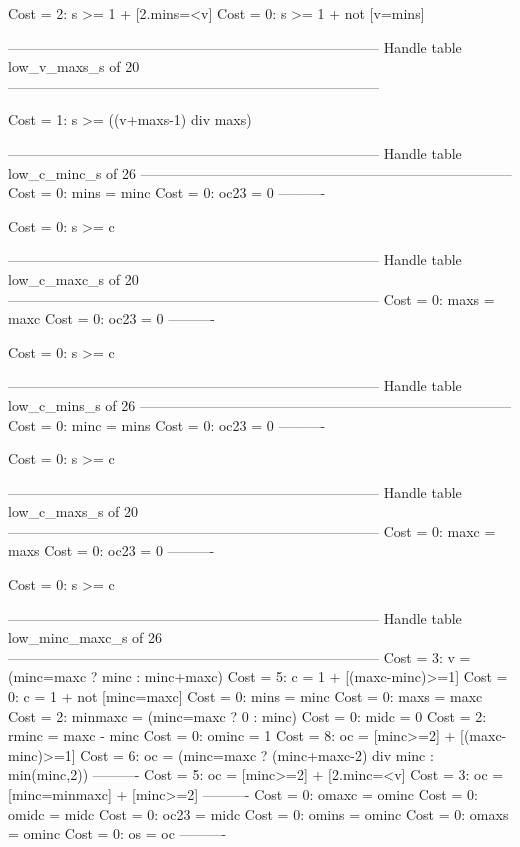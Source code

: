 Cost =  2:  s >= 1 + [2.mins=<v]
Cost =  0:  s >= 1 + not [v=mins]

--------------------------------------------------------------------------------
Handle table low_v_maxs_s of 20
--------------------------------------------------------------------------------

Cost =  1:  s >= ((v+maxs-1) div maxs)

--------------------------------------------------------------------------------
Handle table low_c_minc_s of 26
--------------------------------------------------------------------------------
Cost =  0:  mins = minc
Cost =  0:  oc23 = 0
----------

Cost =  0:  s >= c

--------------------------------------------------------------------------------
Handle table low_c_maxc_s of 20
--------------------------------------------------------------------------------
Cost =  0:  maxs = maxc
Cost =  0:  oc23 = 0
----------

Cost =  0:  s >= c

--------------------------------------------------------------------------------
Handle table low_c_mins_s of 26
--------------------------------------------------------------------------------
Cost =  0:  minc = mins
Cost =  0:  oc23 = 0
----------

Cost =  0:  s >= c

--------------------------------------------------------------------------------
Handle table low_c_maxs_s of 20
--------------------------------------------------------------------------------
Cost =  0:  maxc = maxs
Cost =  0:  oc23 = 0
----------

Cost =  0:  s >= c

--------------------------------------------------------------------------------
Handle table low_minc_maxc_s of 26
--------------------------------------------------------------------------------
Cost =  3:  v       = (minc=maxc ? minc : minc+maxc)
Cost =  5:  c       = 1 + [(maxc-minc)>=1]
Cost =  0:  c       = 1 + not [minc=maxc]
Cost =  0:  mins    = minc
Cost =  0:  maxs    = maxc
Cost =  2:  minmaxc = (minc=maxc ? 0 : minc)
Cost =  0:  midc    = 0
Cost =  2:  rminc   = maxc - minc
Cost =  0:  ominc   = 1
Cost =  8:  oc      = [minc>=2] + [(maxc-minc)>=1]
Cost =  6:  oc      = (minc=maxc ? (minc+maxc-2) div minc : min(minc,2))
----------
Cost =  5:  oc      = [minc>=2] + [2.minc=<v]
Cost =  3:  oc      = [minc=minmaxc] + [minc>=2]
----------
Cost =  0:  omaxc   = ominc
Cost =  0:  omidc   = midc
Cost =  0:  oc23    = midc
Cost =  0:  omins   = ominc
Cost =  0:  omaxs   = ominc
Cost =  0:  os      = oc
----------

